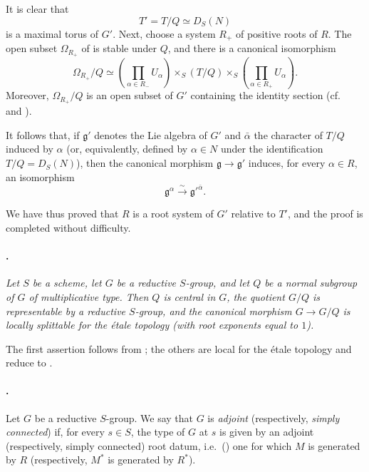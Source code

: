 It is clear that
\[
  T'=T/Q\simeq D_S(N)
\]
is a maximal torus of \(G'\). Next, choose a system \(R_+\) of
positive roots of \(R\). The open subset \(\Omega_{R_+}\) of  is
stable under \(Q\), and there is a canonical isomorphism
\[
  \Omega_{R_+}/Q
  \simeq
  \left(\prod_{\alpha\in R_-}U_\alpha\right)
  \mathop{\times}_S(T/Q)
  \mathop{\times}_S
  \left(\prod_{\alpha\in R_+}U_\alpha\right).
\]
Moreover, \(\Omega_{R_+}/Q\) is an open subset of \(G'\) containing
the identity section \textup{(cf.\  and )}.

It follows that, if \(\mathfrak g'\) denotes the Lie algebra of
\(G'\) and \(\bar\alpha\) the character of \(T/Q\) induced by
\(\alpha\) \textup{(or, equivalently, defined by \(\alpha\in N\)
under the identification \(T/Q=D_S(N)\))}, then the canonical
morphism \(\mathfrak g\to\mathfrak g'\) induces, for every
\(\alpha\in R\), an isomorphism
\[
  \mathfrak g^\alpha
  \xrightarrow{\ \sim\ }
  \mathfrak g'^{\bar\alpha}.
\]

We have thus proved that \(R\) is a root system of \(G'\) relative
to \(T'\), and the proof is completed without difficulty.

\paragraph{.}
\textit{Let \(S\) be a scheme, let \(G\) be a reductive
\(S\)-group, and let \(Q\) be a normal subgroup of \(G\) of
multiplicative type. Then \(Q\) is central in \(G\), the quotient
\(G/Q\) is representable by a reductive \(S\)-group, and the
canonical morphism \(G\to G/Q\) is locally splittable for the
étale topology \textup{(with root exponents equal to \(1\))}.}

The first assertion follows from ; the others are
local for the étale topology and reduce to .

\paragraph{.}
Let \(G\) be a reductive \(S\)-group. We say that \(G\) is
\emph{adjoint} \textup{(respectively, \emph{simply connected})} if,
for every \(s\in S\), the type of \(G\) at \(s\) is given by an
adjoint \textup{(respectively, simply connected)} root datum, i.e.\
\textup{()} one for which \(M\) is generated by
\(R\) \textup{(respectively, \(M^*\) is generated by \(R^*\))}.

